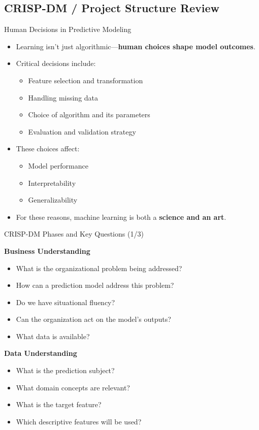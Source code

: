 \documentclass[aspectratio=169,xcolor=dvipsnames]{beamer}
\begin{document}
\subsection{CRISP-DM / Project Structure Review}
\begin{frame}{Human Decisions in Predictive Modeling}

\begin{itemize}
  \item Learning isn't just algorithmic—\textbf{human choices shape model outcomes}.
  \item Critical decisions include:
  \begin{itemize}
    \item Feature selection and transformation
    \item Handling missing data
    \item Choice of algorithm and its parameters
    \item Evaluation and validation strategy
  \end{itemize}
  \item These choices affect:
  \begin{itemize}
    \item Model performance
    \item Interpretability
    \item Generalizability
  \end{itemize}
  \item For these reasons, machine learning is both a \textbf{science and an art}.
\end{itemize}
\end{frame}

\begin{frame}{CRISP-DM Phases and Key Questions (1/3)}

\begin{block}{\textbf{Business Understanding}}
\begin{itemize}
  \item What is the organizational problem being addressed?
  \item How can a prediction model address this problem?
  \item Do we have situational fluency?
  \item Can the organization act on the model's outputs?
  \item What data is available?
\end{itemize}
\end{block}

\vspace{0.5em}

\begin{block}{\textbf{Data Understanding}}
\begin{itemize}
  \item What is the prediction subject?
  \item What domain concepts are relevant?
  \item What is the target feature?
  \item Which descriptive features will be used?
\end{itemize}
\end{block}

\end{frame}
\end{document}
